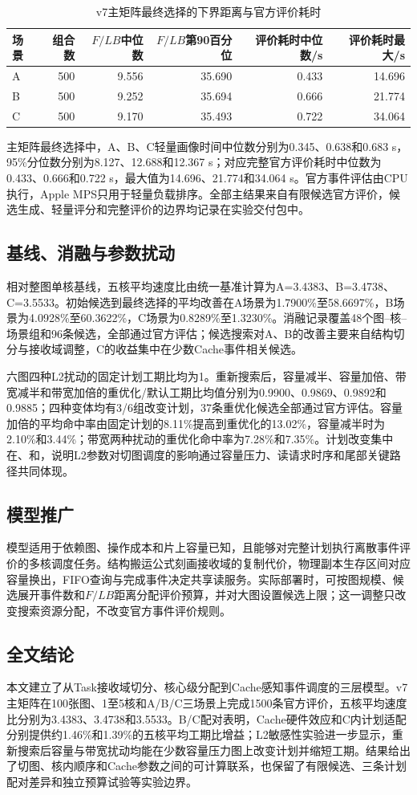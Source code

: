 \begin{table}[H]\centering\small
\caption{v7主矩阵最终选择的下界距离与官方评价耗时}
\label{tab:eval-cost}
\setlength{\tabcolsep}{4pt}
\begin{tabular}{lrrrrr}\toprule
场景 & 组合数 & $F/LB$中位数 & $F/LB$第90百分位 & 评价耗时中位数/s & 评价耗时最大/s\\\midrule
A & 500 & 9.556 & 35.690 & 0.433 & 14.696\\
B & 500 & 9.252 & 35.694 & 0.666 & 21.774\\
C & 500 & 9.170 & 35.493 & 0.722 & 34.064\\\bottomrule
\end{tabular}\end{table}

主矩阵最终选择中，A、B、C轻量画像时间中位数分别为0.345、0.638和0.683 s，95\%分位数分别为8.127、12.688和12.367 s；对应完整官方评价耗时中位数为0.433、0.666和0.722 s，最大值为14.696、21.774和34.064 s。官方事件评估由CPU执行，Apple MPS只用于轻量负载排序。全部主结果来自有限候选官方评价，候选生成、轻量评分和完整评价的边界均记录在实验交付包中。

\subsection{基线、消融与参数扰动}
相对整图单核基线，五核平均速度比由统一基准计算为A=3.4383、B=3.4738、C=3.5533。初始候选到最终选择的平均改善在A场景为1.7900\%至58.6697\%，B场景为4.0928\%至60.3622\%，C场景为0.8289\%至1.3230\%。消融记录覆盖48个图--核--场景组和96条候选，全部通过官方评估；候选搜索对A、B的改善主要来自结构切分与接收域调整，C的收益集中在少数Cache事件相关候选。

六图四种L2扰动的固定计划工期比均为1。重新搜索后，容量减半、容量加倍、带宽减半和带宽加倍的重优化/默认工期比均值分别为0.9900、0.9869、0.9892和0.9885；四种变体均有3/6组改变计划，37条重优化候选全部通过官方评估。容量加倍的平均命中率由固定计划的8.11\%提高到重优化的13.02\%，容量减半时为2.10\%和3.44\%；带宽两种扰动的重优化命中率为7.28\%和7.35\%。计划改变集中在、和，说明L2参数对切图调度的影响通过容量压力、读请求时序和尾部关键路径共同体现。

\subsection{模型推广}
模型适用于依赖图、操作成本和片上容量已知，且能够对完整计划执行离散事件评价的多核调度任务。结构搬运公式刻画接收域的复制代价，物理副本生存区间对应容量换出，FIFO查询与完成事件决定共享读服务。实际部署时，可按图规模、候选展开事件数和$F/LB$距离分配评价预算，并对大图设置候选上限；这一调整只改变搜索资源分配，不改变官方事件评价规则。

\subsection{全文结论}
本文建立了从Task接收域切分、核心级分配到Cache感知事件调度的三层模型。v7主矩阵在100张图、1至5核和A/B/C三场景上完成1500条官方评价，五核平均速度比分别为3.4383、3.4738和3.5533。B/C配对表明，Cache硬件效应和C内计划适配分别提供约1.46\%和1.39\%的五核平均工期比增益；L2敏感性实验进一步显示，重新搜索后容量与带宽扰动均能在少数容量压力图上改变计划并缩短工期。结果给出了切图、核内顺序和Cache参数之间的可计算联系，也保留了有限候选、三条计划配对差异和独立预算试验等实验边界。
